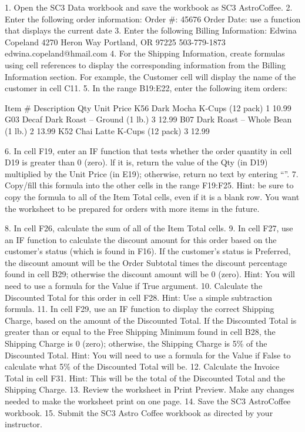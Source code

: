 1. Open the SC3 Data workbook and save the workbook as SC3 AstroCoffee.
2. Enter the following order information:
Order \#: 45676
Order Date: use a function that displays the current date
3. Enter the following Billing Information:
Edwina Copeland
4270 Heron Way Portland, OR 97225
503-779-1873
edwina.copeland@hmail.com
4. For the Shipping Information, create formulas using cell references to display the corresponding
information from the Billing Information section. For example, the Customer cell will display
the name of the customer in cell C11.
5. In the range B19:E22, enter the following item orders:

Item \# Description                       Qty Unit Price
K56    Dark Mocha K-Cups (12 pack)       1    10.99
G03    Decaf Dark Roast – Ground (1 lb.) 3    12.99
B07    Dark Roast – Whole Bean (1 lb.)   2    13.99
K52    Chai Latte K-Cups (12 pack)       3    12.99

6. In cell F19, enter an IF function that tests whether the order quantity in cell D19 is greater than
0 (zero). lf it is, return the value of the Qty (in D19) multiplied by the Unit Price (in E19);
otherwise, return no text by entering “”.
7. Copy/fill this formula into the other cells in the range F19:F25. Hint: be sure to copy the formula to
all of the Item Total cells, even if it is a blank row. You want the worksheet to be prepared for orders with
more items in the future.


8. In cell F26, calculate the sum of all of the Item Total cells.
9. In cell F27, use an IF function to calculate the discount amount for this order based on the
customer’s status (which is found in F16). If the customer’s status is Preferred, the discount
amount will be the Order Subtotal times the discount percentage found in cell B29; otherwise
the discount amount will be 0 (zero). Hint: You will need to use a formula for the Value if True
argument.
10. Calculate the Discounted Total for this order in cell F28. Hint: Use a simple subtraction formula.
11. In cell F29, use an IF function to display the correct Shipping Charge, based on the amount of
the Discounted Total. If the Discounted Total is greater than or equal to the Free Shipping
Minimum found in cell B28, the Shipping Charge is 0 (zero); otherwise, the Shipping Charge is
5\% of the Discounted Total. Hint: You will need to use a formula for the Value if False to calculate what
5\% of the Discounted Total will be.
12. Calculate the Invoice Total in cell F31. Hint: This will be the total of the Discounted Total and the
Shipping Charge.
13. Review the worksheet in Print Preview. Make any changes needed to make the worksheet print
on one page.
14. Save the SC3 AstroCoffee workbook.
15. Submit the SC3 Astro Coffee workbook as directed by your instructor.





